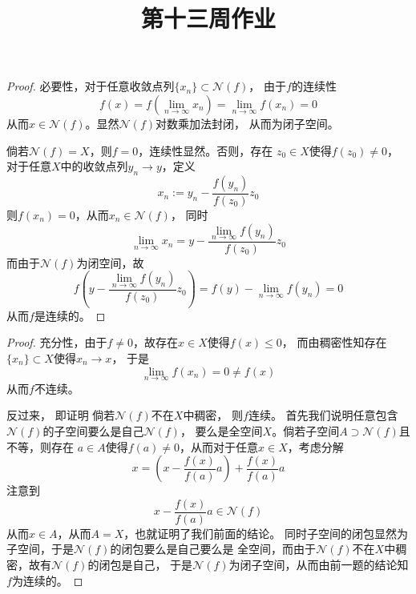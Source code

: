\documentclass[cn]{homework}
\title{第十三周作业}
\begin{document}
    \maketitle
    
    \problem
    \begin{subproblem}[(\arabic*)]
        \item
        \begin{proof}
            必要性，对于任意收敛点列$\{x_n\}\subset\mathcal N(f)$，
            由于$f$的连续性
            \[f(x)=f(\lim_{n\to\infty}x_n)=\lim_{n\to\infty}f(x_n)=0\]
            从而$x\in\mathcal N(f)$。显然$\mathcal N(f)$对数乘加法封闭，
            从而为闭子空间。
            
            倘若$\mathcal N(f)=X$，则$f=0$，连续性显然。否则，存在
            $z_0\in X$使得$f(z_0)\neq 0$，
            对于任意$X$中的收敛点列$y_n\to y$，定义
            \[x_n:=y_n-\frac{f(y_n)}{f(z_0)}z_0\]
            则$f(x_n)=0$，从而$x_n\in\mathcal N(f)$，
            同时
            \[\lim_{n\to\infty} x_n=y-\frac{\displaystyle\lim_{n\to\infty}f(y_n)}{f(z_0)}z_0\]
            而由于$\mathcal N(f)$为闭空间，故
            \[f\left(y-\frac{\displaystyle\lim_{n\to\infty}f(y_n)}{f(z_0)}z_0\right)
            =f(y)-\lim_{n\to\infty}f(y_n)=0\]
            从而$f$是连续的。
        \end{proof}

        \item
        \begin{proof}
            充分性，由于$f\neq 0$，故存在$x\in X$使得$f(x)\leq 0$，
            而由稠密性知存在$\{x_n\}\subset X$使得$x_n\to x$，
            于是
            \[\lim_{n\to\infty}f(x_n)=0\neq f(x)\]
            从而$f$不连续。

            反过来，
            即证明
            倘若$\mathcal N(f)$不在$X$中稠密，
            则$f$连续。
            首先我们说明任意包含$\mathcal N(f)$的子空间要么是自己$\mathcal N(f)$，
            要么是全空间$X$。倘若子空间$A\supset\mathcal N(f)$且不等，则存在
            $a\in A$使得$f(a)\neq 0$，从而对于任意$x\in X$，考虑分解
            \[x=\left(x-\frac{f(x)}{f(a)}a\right)+\frac{f(x)}{f(a)}a\]
            注意到
            \[x-\frac{f(x)}{f(a)}a\in\mathcal N(f)\]
            从而$x\in A$，从而$A=X$，也就证明了我们前面的结论。
            同时子空间的闭包显然为子空间，于是$\mathcal N(f)$的闭包要么是自己要么是
            全空间，而由于$\mathcal N(f)$不在$X$中稠密，故有$\mathcal N(f)$的闭包是自己，
            于是$\mathcal N(f)$为闭子空间，从而由前一题的结论知$f$为连续的。
        \end{proof}
    \end{subproblem}
\end{document}
